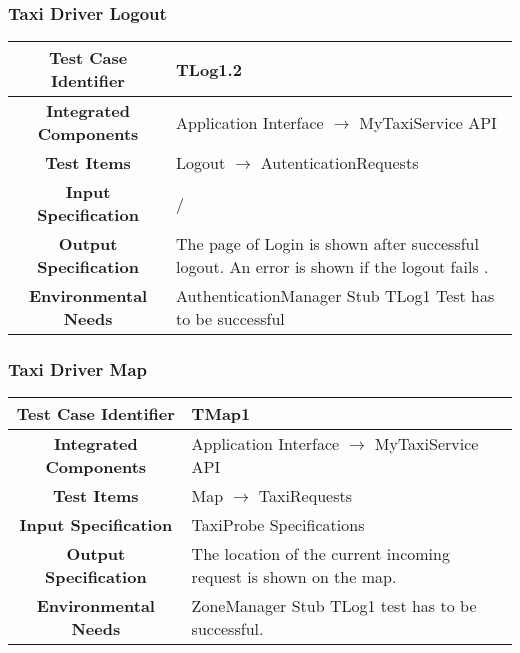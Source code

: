\documentclass[11pt, a4paper,titlepage]{article}
\begin{document}
	\subsubsection{Taxi Driver Logout}
	\begin{tabularx}{\textwidth}{| c|X|}
		\hline \textbf{Test Case Identifier} & \label{TLog1.2}TLog1.2 \\
		\hline \textbf{Integrated Components} & Application Interface $\rightarrow $ MyTaxiService API \\
		\hline \textbf{Test Items} & Logout $\rightarrow $ AutenticationRequests \\
		\hline \textbf{Input Specification} & / \\
		\hline \textbf{Output Specification} & 
		The page of Login is shown after successful logout.\newline
		An error is shown if the logout fails .\\
		\hline \textbf{Environmental Needs} & AuthenticationManager Stub \newline	TLog1 Test has to be successful \\
		\hline
	\end{tabularx}
	\newline
	\newline
	\subsubsection{Taxi Driver Map}
	\begin{tabularx}{\textwidth}{| c|X|}
		\hline \textbf{Test Case Identifier} & \label{TMap1}TMap1 \\
		\hline \textbf{Integrated Components} & Application Interface $\rightarrow $ MyTaxiService API \\
		\hline \textbf{Test Items} & Map $\rightarrow $ TaxiRequests \\
		\hline \textbf{Input Specification} & TaxiProbe Specifications \\
		\hline \textbf{Output Specification} & The location of the current incoming request is shown on the map. \\
		\hline \textbf{Environmental Needs} & ZoneManager Stub \newline TLog1 test has to be successful. \\
		\hline
	\end{tabularx}
	\newline
	\newline
\end{document}
